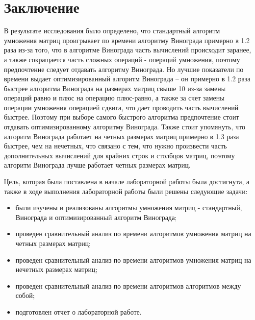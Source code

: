\chapter*{Заключение}

В результате исследования было определено, что стандартный алгоритм умножения матриц проигрывает
по времени алгоритму Винограда примерно в 1.2 раза из-за того, что в алгоритме Винограда 
часть вычислений происходит заранее, а также сокращается часть сложных операций - операций умножения,
поэтому предпочтение следует отдавать алгоритму Винограда. Но лучшие показатели по времени выдает 
оптимизированный алгоритм Винограда -- он примерно в 1.2 раза быстрее алгоритма Винограда на размерах
матриц свыше 10 из-за замены операций равно и плюс на операцию плюс-равно, а также за счет замены
операции умножения операцией сдвига, что дает проводить часть вычислений быстрее. Поэтому при выборе
самого быстрого алгоритма предпочтение стоит отдавать оптимизированному алгоритму Винограда. Также
стоит упомянуть, что алгоритм Винограда работает на четных размерах матриц примерно в 1.3 раза
быстрее, чем на нечетных, что связано с тем, что нужно произвести часть дополнительных вычислений
для крайних строк и столбцов матриц, поэтому алгоритм Винограда лучше работает четных размерах матриц.


Цель, которая была поставлена в начале лабораторной работы была достигнута, а также в ходе выполнения лабораторной работы были решены следующие задачи:

\begin{itemize}
	\item были изучены и реализованы алгоритмы умножения матриц - стандартный, Винограда и оптимизированный алгоритм Винограда;
    \item проведен сравнительный анализ по времени алгоритмов умножения матриц на четных размерах матриц;
	\item проведен сравнительный анализ по времени алгоритмов умножения матриц на нечетных размерах матриц;
	\item проведен сравнительный анализ по времени алгоритмов алгоритмов между собой;
	\item подготовлен отчет о лабораторной работе.
\end{itemize}